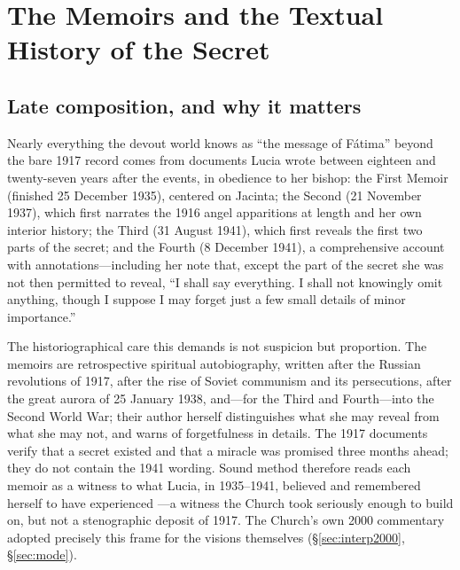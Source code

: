 \section{The Memoirs and the Textual History of the Secret}\label{sec:memoirs}

\subsection{Late composition, and why it matters}

Nearly everything the devout world knows as ``the message of
F\'atima'' beyond the bare 1917 record comes from documents Lucia
wrote between eighteen and twenty-seven years after the events, in
obedience to her bishop: the First Memoir (finished 25 December 1935),
centered on Jacinta; the Second (21 November 1937), which first
narrates the 1916 angel apparitions at length and her own interior
history; the Third (31 August 1941), which first reveals the first
two parts of the secret; and the Fourth (8 December 1941), a
comprehensive account with annotations---including her note that,
except the part of the secret she was not then permitted to reveal,
``I shall say everything. I shall not knowingly omit anything, though
I suppose I may forget just a few small details of minor
importance.''

The historiographical care this demands is not suspicion but
proportion. The memoirs are retrospective spiritual autobiography,
written after the Russian revolutions of 1917, after the rise of
Soviet communism and its persecutions, after the great aurora of
25 January 1938, and---for the Third and Fourth---into the Second
World War; their author herself distinguishes what she may reveal
from what she may not, and warns of forgetfulness in details. The
1917 documents verify that a secret existed and that a miracle was
promised three months ahead; they do not contain the 1941 wording.
Sound method therefore reads each memoir as a witness to what Lucia,
in 1935--1941, believed and remembered herself to have experienced
---a witness the Church took seriously enough to build on, but not a
stenographic deposit of 1917. The Church's own 2000 commentary
adopted precisely this frame for the visions themselves
(\S\ref{sec:interp2000}, \S\ref{sec:mode}).

